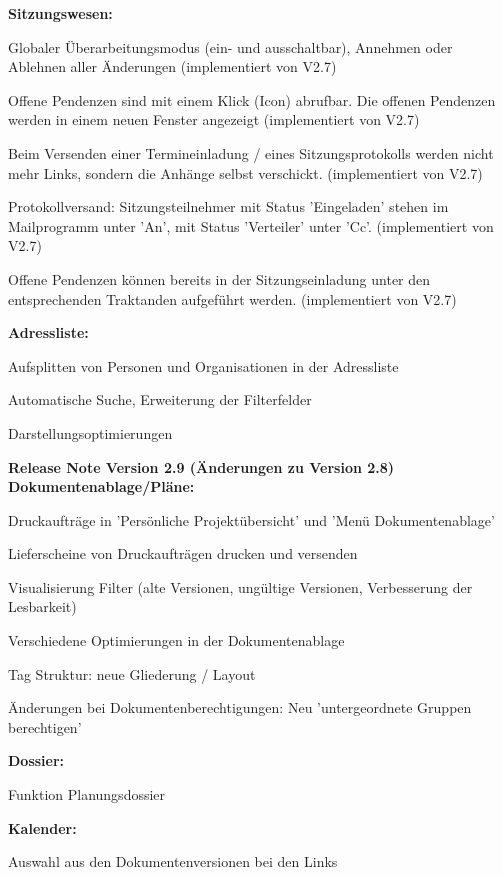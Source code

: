 \textbf{Sitzungswesen:}
\begin{compactitem}
	\item Globaler Überarbeitungsmodus (ein- und ausschaltbar), Annehmen oder Ablehnen aller Änderungen (implementiert von V2.7)
	\item Offene Pendenzen sind  mit einem Klick (Icon) abrufbar. Die offenen Pendenzen werden in einem neuen Fenster angezeigt (implementiert von V2.7)
	\item Beim Versenden einer Termineinladung / eines Sitzungsprotokolls werden nicht mehr Links, sondern die Anhänge selbst verschickt. (implementiert von V2.7)
	\item Protokollversand: Sitzungsteilnehmer mit Status 'Eingeladen' stehen im Mailprogramm unter 'An', mit Status 'Verteiler' unter 'Cc'. (implementiert von V2.7)
	\item Offene Pendenzen können bereits in der Sitzungseinladung unter den entsprechenden Traktanden aufgeführt werden. (implementiert von V2.7)
\end{compactitem}

\textbf{Adressliste:}
\begin{compactitem}
	\item Aufsplitten von Personen und Organisationen in der Adressliste
	\item Automatische Suche, Erweiterung der Filterfelder
	\item Darstellungsoptimierungen
\end{compactitem}

\vspace{\baselineskip}

\textbf{Release Note Version 2.9 (Änderungen zu Version 2.8)} \\
\textbf{Dokumentenablage/Pläne:}
\begin{compactitem}
	\item Druckaufträge in 'Persönliche Projektübersicht' und 'Menü Dokumentenablage' 
	\item Lieferscheine von Druckaufträgen drucken und versenden
	\item Visualisierung Filter (alte Versionen, ungültige Versionen, Verbesserung der Lesbarkeit)
	\item Verschiedene Optimierungen in der Dokumentenablage
	\item Tag Struktur: neue Gliederung / Layout
	\item Änderungen bei Dokumentenberechtigungen: Neu 'untergeordnete Gruppen berechtigen'
\end{compactitem}
\textbf{Dossier:}
\begin{compactitem}
	\item Funktion Planungsdossier 
\end{compactitem}
\textbf{Kalender:}
\begin{compactitem}
	\item Auswahl aus den Dokumentenversionen bei den Links 
\end{compactitem}

